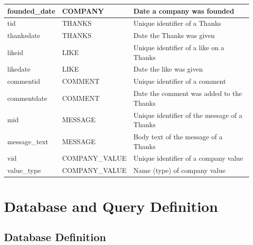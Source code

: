 \documentclass[11pt]{report}
\begin{document}
\begin{table}[h]
{\begin{tabular}{|l|l|l|}
founded\_date                            & COMPANY                                      & Date a company was founded                       \\ \hline
tid                                      & THANKS                                       & Unique identifier of a Thanks                    \\ \hline
thanksdate                               & THANKS                                       & Date the Thanks was given                        \\ \hline
likeid                                   & LIKE                                         & Unique identifier of a like on a Thanks          \\ \hline
likedate                                 & LIKE                                         & Date the like was given                          \\ \hline
commentid                                & COMMENT                                      & Unique identifier of a comment                   \\ \hline
commentdate                              & COMMENT                                      & Date the comment was added to the Thanks         \\ \hline
mid                                      & MESSAGE                                      & Unique identifier of the message of a Thanks     \\ \hline
message\_text                            & MESSAGE                                      & Body text of the message of a Thanks             \\ \hline
vid                                      & COMPANY\_VALUE                               & Unique identifier of a company value             \\ \hline
value\_type                              & COMPANY\_VALUE                               & Name (type) of company value                     \\ \hline
\end{tabular}
}
\end{table}
\clearpage

\chapter{Database and Query Definition}

\section{Database Definition}

\end{document}
